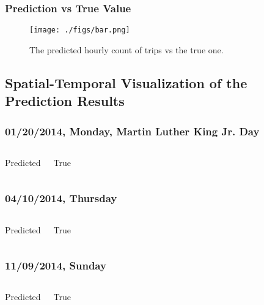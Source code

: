 \documentclass{beamer}
\begin{document}
\begin{frame}
  \frametitle{Prediction vs True Value}
  \begin{figure}[H] 
    \centering
    \texttt{[image: ./figs/bar.png]}
    \caption{The predicted hourly count of trips vs the true one.}
    \label{fig:pred_vs_true}
  \end{figure}
\end{frame}

\subsection[Visualization]{Spatial-Temporal Visualization of the
Prediction Results}
\begin{frame}
  \frametitle{01/20/2014, Monday, Martin Luther King Jr. Day}
  \begin{columns}[c]
    Predicted

    True
  \end{columns}
\end{frame}

\begin{frame}
  \frametitle{04/10/2014, Thursday}
  \begin{columns}[c]
    Predicted

    True
  \end{columns}
\end{frame}

\begin{frame}
  \frametitle{11/09/2014, Sunday}
  \begin{columns}[c]
    Predicted

    True
  \end{columns}
\end{frame}
\end{document}
